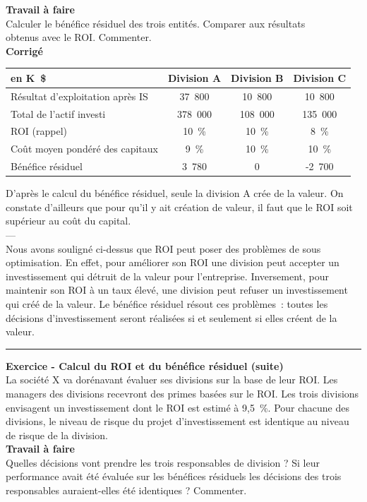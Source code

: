 \documentclass{kaobook}
\begin{document}
\textbf{Travail à faire}\\
Calculer le bénéfice résiduel des trois entités. Comparer aux résultats\\
obtenus avec le ROI. Commenter.\\

\textbf{Corrigé}\\
\begin{center}
\begin{tabular}{l c c c}
en K \$ & Division A & Division B & Division C\\
\hline
Résultat d'exploitation après IS & 37 800 & 10 800 & 10 800\\
Total de l'actif investi & 378 000 & 108 000 & 135 000\\
ROI (rappel) & 10 \% & 10 \% & 8 \%\\
Coût moyen pondéré des capitaux & 9 \% & 10 \% & 10 \%\\
Bénéfice résiduel & 3 780 & 0 & -2 700\\
\end{tabular}
\end{center}
D'après le calcul du bénéfice résiduel, seule la division A crée de la valeur. On constate d'ailleurs que pour qu'il y ait création de valeur, il faut que le ROI soit supérieur au coût du capital.\\
---\\

Nous avons souligné ci-dessus que ROI peut poser des problèmes de sous optimisation. En effet, pour améliorer son ROI une division peut accepter un investissement qui détruit de la valeur pour l'entreprise. Inversement, pour maintenir son ROI à un taux élevé, une division peut refuser un investissement qui créé de la valeur. Le bénéfice résiduel résout ces problèmes : toutes les décisions d'investissement seront réalisées si et seulement si elles créent de la valeur.\\

\noindent\rule{\textwidth}{0.5pt}
\textbf{Exercice - Calcul du ROI et du bénéfice résiduel (suite)}\\
La société X va dorénavant évaluer ses divisions sur la base de leur ROI. Les managers des divisions recevront des primes basées sur le ROI. Les trois divisions envisagent un investissement dont le ROI est estimé à 9,5 \%. Pour chacune des divisions, le niveau de risque du projet d'investissement est identique au niveau de risque de la division.\\

\textbf{Travail à faire}\\
Quelles décisions vont prendre les trois responsables de division ? Si leur performance avait été évaluée sur les bénéfices résiduels les décisions des trois responsables auraient-elles été identiques ? Commenter.\\
\end{document}
